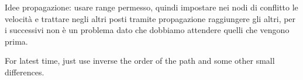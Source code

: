 \documentclass[class=article, crop=false]{standalone}
\begin{document}
Idee propagazione:
usare range permesso, quindi impostare nei nodi di conflitto le velocità e trattare negli altri posti tramite propagazione raggiungere gli altri, per i successivi non è un problema dato che dobbiamo attendere quelli che vengono prima.

For latest time, just use inverse the order of the path and some other small differences.
\end{document}
